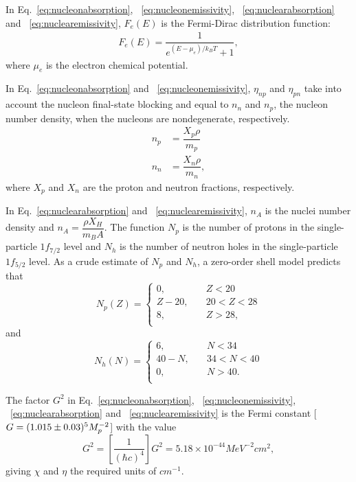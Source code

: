 \documentclass[10pt,preprint]{aastex}
\begin{document}
In Eq.~\eqref{eq:nucleonabsorption}, ~\eqref{eq:nucleonemissivity}, ~\eqref{eq:nuclearabsorption} and ~\eqref{eq:nuclearemissivity}, $F_e(E)$ is the Fermi-Dirac distribution function:
\begin{align}
F_e(E) = \dfrac{1}{e^{(E-\mu_e)/k_B T} + 1},
\end{align}
where $\mu_e$ is the electron chemical potential.

In Eq.~\eqref{eq:nucleonabsorption} and ~\eqref{eq:nucleonemissivity}, $\eta_{np}$ and $\eta_{pn}$ take into account the nucleon final-state blocking and equal to $n_n$ and $n_p$, the nucleon number density, when the nucleons are nondegenerate, respectively.
\begin{align}
n_p & =  \dfrac{X_p \rho}{m_p} \\
n_n & =  \dfrac{X_n \rho}{m_n},
\end{align}
where $X_p$ and $X_n$ are the proton and neutron fractions, respectively.

In Eq.~\eqref{eq:nuclearabsorption} and ~\eqref{eq:nuclearemissivity}, $n_A$ is the nuclei number density and $n_A = \dfrac{\rho X_H}{m_B A}$. The function $N_p$ is the number of protons in the single-particle $1f_{7/2}$ level and $N_h$ is the number of neutron holes in the single-particle $1f_{5/2}$ level. As a crude estimate of $N_p$ and $N_h$, a zero-order shell model predicts that
\[   
N_p(Z) = 
     \begin{cases}
       0, &\quad Z<20\\
       Z-20, &\quad 20<Z<28 \\
       8, &\quad Z>28,\\
     \end{cases}
\]
and
\[   
N_h(N) = 
     \begin{cases}
       6, &\quad N<34\\
       40-N, &\quad 34<N<40 \\
       0, &\quad N>40.\\
     \end{cases}
\]

The factor $G^2$ in Eq.~\eqref{eq:nucleonabsorption}, ~\eqref{eq:nucleonemissivity}, ~\eqref{eq:nuclearabsorption} and ~\eqref{eq:nuclearemissivity} is the Fermi constant [$G=(1.015\pm 0.03)\time 10^5 M_p^{-2}$] with the value
\begin{equation}
G^2 = \left[ \dfrac{1}{(\hbar c)^4} \right] G^2 = 5.18 \times 10^{-44} MeV^{-2}cm^2, 
\end{equation}
giving $\chi$ and $\eta$ the required units of $cm^{-1}$.
\end{document}
